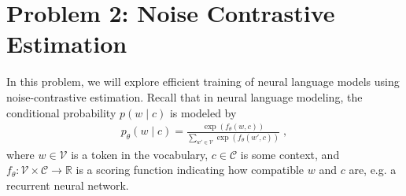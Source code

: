 \documentclass{article}
\theoremstyle{case}
\theoremstyle{definition}
\begin{document}
\section*{Problem 2: Noise Contrastive Estimation}
In this problem, we will explore efficient training of neural language models using noise-contrastive estimation.
Recall that in neural language modeling, the conditional probability $p(w\mid c)$
is modeled by
\begin{align}
p_\theta(w\mid c) = \frac{\exp(f_\theta(w, c))}{\sum_{w'\in\mathcal{V}}\exp(f_\theta(w', c))} \;,
    \label{eqn:softmax}
\end{align}
where $w\in\mathcal{V}$ is a token in the vocabulary,
$c\in\mathcal{C}$ is some context,
and $f_\theta\colon \mathcal{V} \times \mathcal{C} \rightarrow \mathbb{R}$
is a scoring function indicating how compatible $w$ and $c$ are,
e.g. a recurrent neural network.
\end{document}
